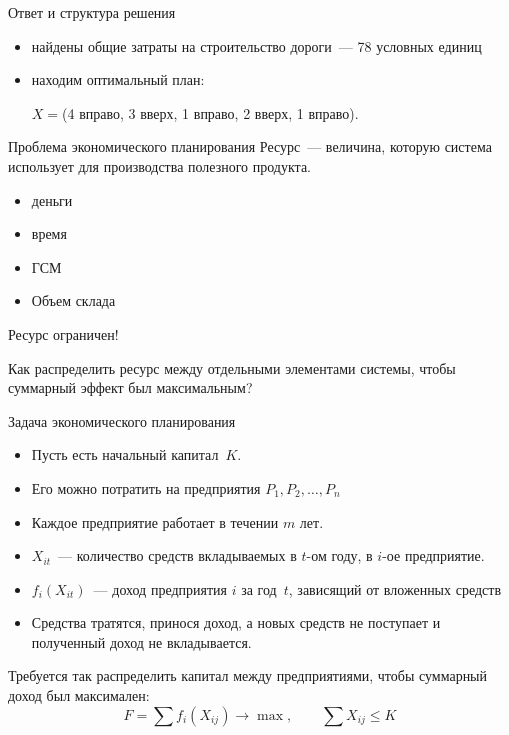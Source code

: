\documentclass[unicode,11pt,notheorems,xcolor=table]{beamer}
\begin{document}
\begin{frame}{Ответ и структура решения}
\begin{itemize}
\item 
	 найдены
	общие затраты на строительство дороги~--- \alert{78 условных единиц}
\item 
	 находим оптимальный план:
	
	\alert{$X=$(4 вправо, 3 вверх, 1 вправо, 2 вверх, 1 вправо).}
\end{itemize}
\end{frame}



\begin{frame}{Проблема экономического планирования}
\alert{Ресурс}~---  величина, которую система использует для  производства полезного продукта. 

\begin{itemize}
\item 
	деньги
\item 
	время
\item 
	ГСМ
\item 
	Объем склада
\end{itemize}
\alert{Ресурс ограничен!}

\begin{block}{}
	Как распределить ресурс между отдельными элементами системы, чтобы суммарный эффект был максимальным?
\end{block}
\end{frame}
\begin{frame}{Задача экономического планирования}
\begin{itemize}
\item 
	Пусть есть начальный капитал~$K$.     

\item 
	Его можно потратить на предприятия	$P_1, P_2, \ldots, P_n$

\item 
 Каждое предприятие работает в течении $m$ лет.
  
\item 
	$X_{it}$~--- количество средств вкладываемых в $t$-ом году, в $i$-ое предприятие. 
\item 
	$f_i(X_{it})$~--- доход предприятия $i$ за год~$t$, зависящий от вложен­ных средств
	  
\item
	Средства тратятся, принося доход, а новых средств не поступает и полученный доход не вкладывается.	  
\end{itemize}
\begin{block}{}
Требуется так распределить капитал между предприятиями, чтобы суммарный доход был максимален:
	$$
	F= \sum f_i(X_{ij}) \to \max,
	\qquad	
	\sum X_{ij} \leqslant K
	$$
\end{block}
\end{frame}
\end{document}
